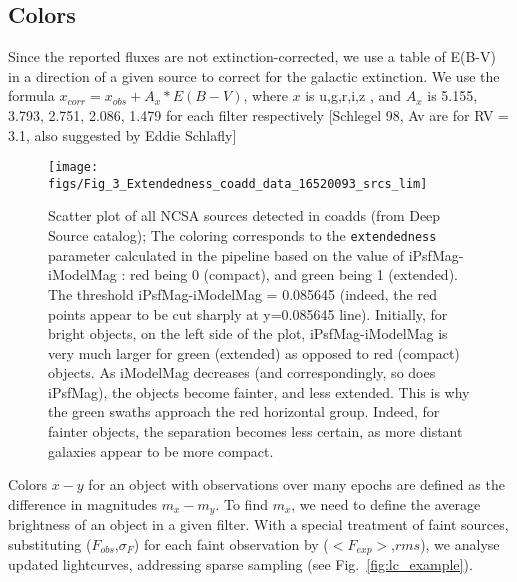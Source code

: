 \documentclass[fleqn,usenatbib]{mnras}  %
\begin{document}
%
% 




\subsection{Colors}
%
%


%
%


%
%


Since the reported fluxes are not extinction-corrected, we use a table of E(B-V) in a direction of a given source to correct for the galactic extinction. We use the formula  $x_{corr}  = x_{obs} + A_{x} * E(B-V)$, where $x$ is  u,g,r,i,z , and $A_x$ is 5.155, 3.793, 2.751, 2.086, 1.479  for each filter respectively  [Schlegel 98, Av are for RV = 3.1, also suggested by Eddie Schlafly] 


\begin{figure}

 \texttt{[image: figs/Fig\_3\_Extendedness\_coadd\_data\_16520093\_srcs\_lim]}
 \cprotect\caption{Scatter plot of all NCSA sources detected in coadds (from Deep Source catalog); The coloring corresponds to the \verb|extendedness | parameter calculated in the pipeline based on the value of iPsfMag-iModelMag : red being 0 (compact), and green being 1 (extended). The threshold iPsfMag-iModelMag  = 0.085645 (indeed, the red points appear to be cut sharply at y=0.085645 line).  Initially, for bright objects, on the left side of the plot, iPsfMag-iModelMag is very much larger for green (extended) as opposed to red (compact) objects. As iModelMag decreases  (and correspondingly, so does iPsfMag), the objects become fainter, and less extended. This is why the green swaths approach the red horizontal group. Indeed, for fainter objects, the separation becomes less certain, as more distant galaxies appear to be more compact.  }
\label{fig:extendedness}
\end{figure}

Colors $x-y$ for an object with observations over many epochs are defined as the difference in magnitudes $m_{x} - m_{y}$. To find $m_{x}$, we need to define the average brightness of an object in  a given filter. With a special treatment of faint sources, substituting ($F_{obs}$,$\sigma_F$) for each faint observation by ($<F_{exp}>$,$rms$), we analyse updated lightcurves, addressing sparse sampling (see Fig.~\ref{fig:lc_example}).  
\end{document}
